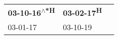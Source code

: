 \begin{supertabular}{lll}
 \textbf{03-10-16\textsuperscript{$\wedge$*H}} &  \textbf{03-02-17\textsuperscript{H}} \\
                    03-01-17\textsuperscript{} &            03-10-19\textsuperscript{} \\
\end{supertabular}
